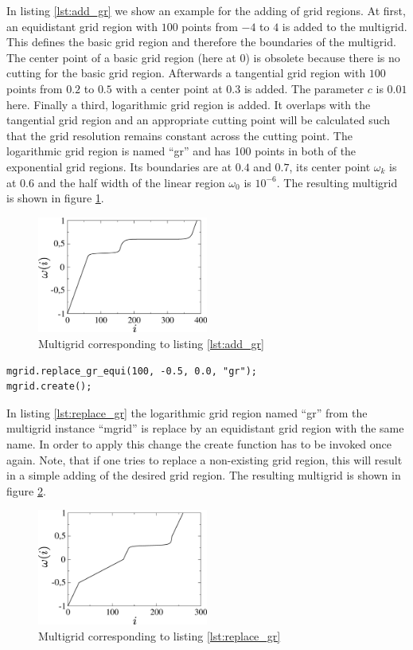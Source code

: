In listing \ref{lst:add_gr} we show an example for the adding of grid regions. At first, an equidistant grid region with $100$ points from $-4$ to $4$ is added to the multigrid. This defines the basic grid region and therefore the boundaries of the multigrid. The center point of a basic grid region (here at $0$) is obsolete because there is no cutting for the basic grid region. Afterwards a tangential grid region with $100$ points from $0.2$ to $0.5$ with a center point at $0.3$ is added. The parameter $c$ is $0.01$ here. Finally a third, logarithmic grid region is added. It overlaps with the tangential grid region and an appropriate cutting point will be calculated such that the grid resolution remains constant across the cutting point. The logarithmic grid region is named   ``gr'' and has 100 points in both of the exponential grid regions. Its boundaries are at $0.4$ and $0.7$, its center point $\omega_k$ is at $0.6$ and the half width of the linear region $\omega_0$ is $10^{-6}$. The resulting multigrid is shown in figure \ref{fig:example_add_gr}.
\begin{figure}[h]
	\centering
	\includegraphics[width=0.5\textwidth]{pics/example_add_gr.eps}
	\caption{Multigrid corresponding to listing \ref{lst:add_gr}}
	\label{fig:example_add_gr}
\end{figure}

\begin{lstlisting}[caption={Example for replacing a grid region},label={lst:replace_gr}]
mgrid.replace_gr_equi(100, -0.5, 0.0, "gr");
mgrid.create();
\end{lstlisting}

In listing \ref{lst:replace_gr} the logarithmic grid region named ``gr'' from the multigrid instance ``mgrid'' is replace by an equidistant grid region with the same name. In order to apply this change the create function has to be invoked once again. Note, that if one tries to replace a non-existing grid region, this will result in a simple adding of the desired grid region. The resulting multigrid is shown in figure \ref{fig:example_replace_gr}.
\begin{figure}[h]
	\centering
	\includegraphics[width=0.5\textwidth]{pics/example_replace_gr.eps}
	\caption{Multigrid corresponding to listing \ref{lst:replace_gr}}
	\label{fig:example_replace_gr}
\end{figure}

